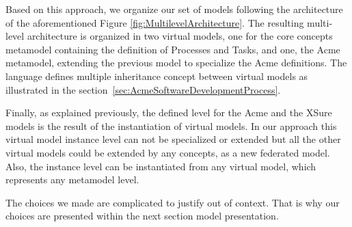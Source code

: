 Based on this approach, we organize our set of models following the architecture of the aforementioned Figure \ref{fig:MultilevelArchitecture}. The resulting multi-level architecture is organized in two virtual models, one for the core concepts metamodel containing the definition of Processes and Tasks, and one, the Acme metamodel, extending the previous model to specialize the Acme definitions. The \FML language defines multiple inheritance concept between virtual models as illustrated in the section~\ref{sec:AcmeSoftwareDevelopmentProcess}.

Finally, as explained previously, the defined level for the Acme  and the XSure models is the result of the instantiation of virtual models. In our approach this virtual model instance level can not be specialized or extended but all the other virtual models could be extended by any concepts, as a new federated model.
Also, the instance level can be instantiated from any virtual model, which represents any metamodel level.




The choices we made are complicated to justify out of context. That is why our choices are presented within the next section model presentation.




